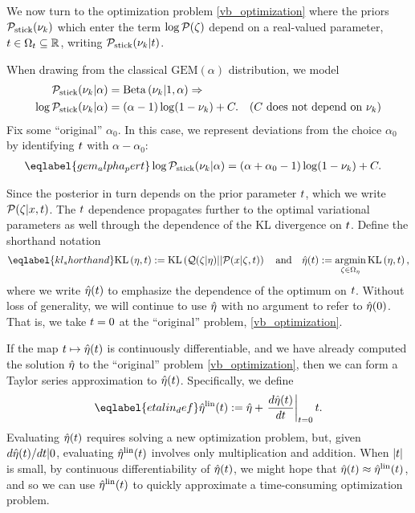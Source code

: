 We now turn to the optimization problem \eqref{vb_optimization} where the priors
$\mathcal{P}_{\mathrm{stick}}(\nu_{k})$ which enter the term $\log \mathcal{P}(\zeta)$ depend on a real-valued
parameter, $t \in \Omega_{t} \subseteq \mathbb{R}$, writing $\mathcal{P}_{\mathrm{stick}}(\nu_{k} \vert
t)$.

\begin{ex}
%
When drawing from the classical $\mathrm{GEM}(\alpha)$ distribution, we
model
%
\begin{align*}
%
\pstick(\nuk \vert \alpha) ={}&
    \betadist{\nuk \vert 1, \alpha} \Rightarrow\\
\log \pstick(\nuk \vert \alpha) ={}&
    (\alpha - 1) \log(1 - \nuk) + \const. &
    \constdesc{\nuk}
%
\end{align*}
%
Fix some ``original'' $\alpha_0$.  In this case, we represent deviations from
the choice $\alpha_0$ by identifying $t$ with $\alpha - \alpha_0$:
%
\begin{align}\eqlabel{gem_alpha_pert}
%
\log \pstick(\nuk \vert \alpha) ={}&
    (\alpha + \alpha_0 - 1) \log(1 - \nuk) + \const.
%
\end{align}
%
\end{ex}

Since the posterior in turn depends on the prior parameter $t$, which we write
$\mathcal{P}(\zeta \vert x, t)$. The $t$ dependence propagates further to the optimal
variational parameters as well through the dependence of the KL divergence on
$t$.  Define the shorthand notation
%
\begin{align}\eqlabel{kl_shorthand}
%
\KL{\eta, \t} := \KL{\q(\zeta \vert \eta) || \p(\x \vert \zeta, \t)}
\mathand
\etaopt(\t) := \argmin_{\zeta \in \etadom} \KL{\eta, \t},
%
\end{align}
%
where we write $\hat\eta(t)$ to emphasize the dependence of the optimum on $t$.
Without loss of generality, we will continue to use $\hat\eta$ with no argument
to refer to $\hat\eta(0)$.  That is, we take $t = 0$ at the ``original''
problem, \eqref{vb_optimization}.

If the map $t \mapsto \hat\eta(t)$ is continuously differentiable, and we have
already computed the solution $\hat\eta$ to the ``original'' problem
\eqref{vb_optimization}, then we can form a Taylor series approximation to
$\hat\eta(t)$.  Specifically, we define
%
\begin{align}\eqlabel{etalin_def}
%
\etalin(\t) := \etaopt + \fracat{d \etaopt(\t)}{d \t}{\t=0} \t .
%
\end{align}
%
Evaluating $\hat\eta(t)$ requires solving a new optimization problem, but, given
$d\hat\eta(t) / dt | 0$, evaluating $\hat\eta^{\mathrm{lin}}(t)$ involves only
multiplication and addition.  When $|t|$ is small, by continuous
differentiability of $\hat\eta(t)$, we might hope that $\hat\eta(t) \approx
\hat\eta^{\mathrm{lin}}(t)$, and so we can use $\hat\eta^{\mathrm{lin}}(t)$ to quickly approximate a
time-consuming optimization problem.

